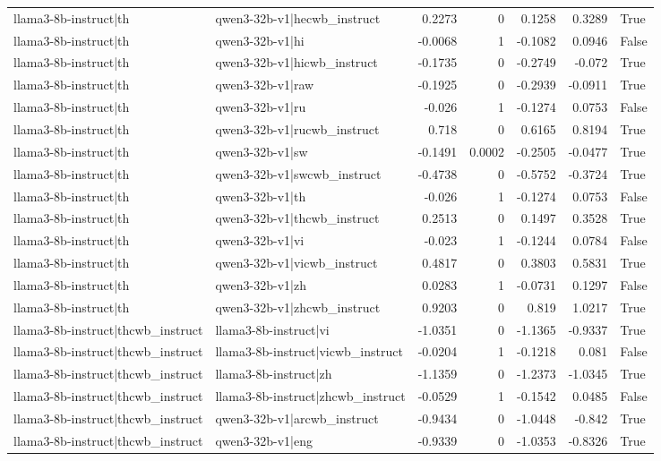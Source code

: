 \begin{table}
\begin{tabular}{l l r r r r l}
llama3-8b-instruct|th & qwen3-32b-v1|hecwb_instruct & 0.2273 & 0 & 0.1258 & 0.3289 & True \\
llama3-8b-instruct|th & qwen3-32b-v1|hi & -0.0068 & 1 & -0.1082 & 0.0946 & False \\
llama3-8b-instruct|th & qwen3-32b-v1|hicwb_instruct & -0.1735 & 0 & -0.2749 & -0.072 & True \\
llama3-8b-instruct|th & qwen3-32b-v1|raw & -0.1925 & 0 & -0.2939 & -0.0911 & True \\
llama3-8b-instruct|th & qwen3-32b-v1|ru & -0.026 & 1 & -0.1274 & 0.0753 & False \\
llama3-8b-instruct|th & qwen3-32b-v1|rucwb_instruct & 0.718 & 0 & 0.6165 & 0.8194 & True \\
llama3-8b-instruct|th & qwen3-32b-v1|sw & -0.1491 & 0.0002 & -0.2505 & -0.0477 & True \\
llama3-8b-instruct|th & qwen3-32b-v1|swcwb_instruct & -0.4738 & 0 & -0.5752 & -0.3724 & True \\
llama3-8b-instruct|th & qwen3-32b-v1|th & -0.026 & 1 & -0.1274 & 0.0753 & False \\
llama3-8b-instruct|th & qwen3-32b-v1|thcwb_instruct & 0.2513 & 0 & 0.1497 & 0.3528 & True \\
llama3-8b-instruct|th & qwen3-32b-v1|vi & -0.023 & 1 & -0.1244 & 0.0784 & False \\
llama3-8b-instruct|th & qwen3-32b-v1|vicwb_instruct & 0.4817 & 0 & 0.3803 & 0.5831 & True \\
llama3-8b-instruct|th & qwen3-32b-v1|zh & 0.0283 & 1 & -0.0731 & 0.1297 & False \\
llama3-8b-instruct|th & qwen3-32b-v1|zhcwb_instruct & 0.9203 & 0 & 0.819 & 1.0217 & True \\
llama3-8b-instruct|thcwb_instruct & llama3-8b-instruct|vi & -1.0351 & 0 & -1.1365 & -0.9337 & True \\
llama3-8b-instruct|thcwb_instruct & llama3-8b-instruct|vicwb_instruct & -0.0204 & 1 & -0.1218 & 0.081 & False \\
llama3-8b-instruct|thcwb_instruct & llama3-8b-instruct|zh & -1.1359 & 0 & -1.2373 & -1.0345 & True \\
llama3-8b-instruct|thcwb_instruct & llama3-8b-instruct|zhcwb_instruct & -0.0529 & 1 & -0.1542 & 0.0485 & False \\
llama3-8b-instruct|thcwb_instruct & qwen3-32b-v1|arcwb_instruct & -0.9434 & 0 & -1.0448 & -0.842 & True \\
llama3-8b-instruct|thcwb_instruct & qwen3-32b-v1|eng & -0.9339 & 0 & -1.0353 & -0.8326 & True \\

\end{tabular}
\end{table}

